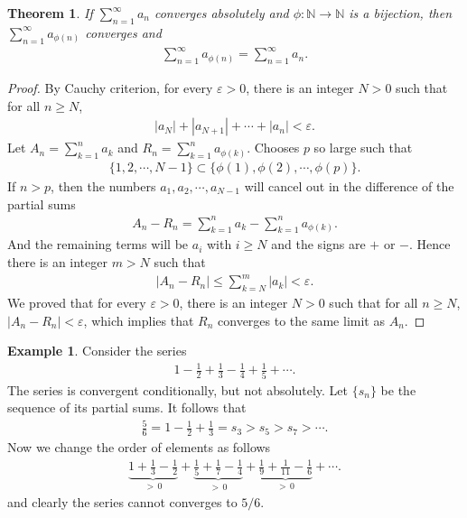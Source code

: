 \documentclass[11pt]{book}
\newtheorem{theorem}{Theorem}[chapter]
\theoremstyle{definition}
\newtheorem{example}{Example}[chapter]
\numberwithin{equation}{chapter}
\begin{document}
\medskip

\begin{theorem}
If $\sum^\infty_{n=1} a_n$ converges absolutely and $\phi: \mathbb{N} \to \mathbb{N}$ is a bijection, then $\sum^\infty_{n=1} a_{\phi(n)}$ converges and 
\begin{align*}
    \sum^\infty_{n=1} a_{\phi(n)} = \sum^\infty_{n=1} a_n.
\end{align*}
\end{theorem}
\begin{proof}
By Cauchy criterion, for every $\varepsilon > 0$, there is an integer $N > 0$ such that for all $n \geq N$,
\begin{align*}
    \left|a_N\right| + \left|a_{N+1}\right| + \cdots + \left|a_n\right| < \varepsilon.
\end{align*}
Let $A_n = \sum^n_{k=1} a_k$ and $R_n = \sum^n_{k=1} a_{\phi(k)}$. Chooses $p$ so large such that
\begin{align*}
    \{1,2,\cdots,N-1\} \subset \{\phi(1),\phi(2),\cdots,\phi(p)\}.
\end{align*}
If $n > p$, then the numbers $a_1,a_2, \cdots, a_{N-1}$ will cancel out in the difference of the partial sums
\begin{align*}
    A_n - R_n = \sum^n_{k=1} a_k - \sum^n_{k=1} a_{\phi(k)}.
\end{align*}
And the remaining terms will be $a_i$ with $i \geq N$ and the signs are $+$ or $-$. Hence there is an integer $m > N$ such that 
\begin{align*}
    \left|A_n - R_n\right| \leq \sum^m_{k=N} \left|a_k\right| < \varepsilon.
\end{align*}
We proved that for every $\varepsilon > 0$, there is an integer $N > 0$ such that for all $n \geq N$, $\left|A_n - R_n\right| < \varepsilon$, which implies that $R_n$ converges to the same limit as $A_n$.
\end{proof}

\medskip

\begin{example}
Consider the series
\begin{align*}
    1 - \frac{1}{2} + \frac{1}{3} - \frac{1}{4} + \frac{1}{5} + \cdots.
\end{align*}
The series is convergent conditionally, but not absolutely. Let $\{s_n\}$ be the sequence of its partial sums. It follows that
\begin{align*}
    \frac{5}{6} = 1 - \frac{1}{2} + \frac{1}{3} = s_3 > s_5 > s_7 > \cdots.
\end{align*}
Now we change the order of elements as follows
\begin{align*}
    \underbrace{1 + \frac{1}{3} - \frac{1}{2}}_{>\,0} + \underbrace{\frac{1}{5} + \frac{1}{7} - \frac{1}{4}}_{>\,0} + \underbrace{\frac{1}{9} + \frac{1}{11} - \frac{1}{6}}_{>\,0} + \cdots.
\end{align*}
and clearly the series cannot converges to $5/6$.
\end{example}
\end{document}
